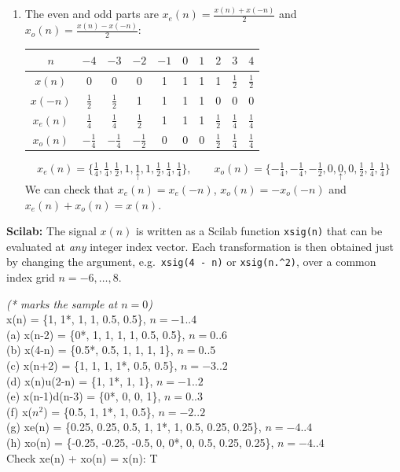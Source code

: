 \documentclass[12pt,a4paper]{article}
\newcommand{\org}[1]{\underset{\uparrow}{#1}}
\begin{document}
\begin{enumerate}[label=\textbf{(\alph*)}, leftmargin=*]
    \item[\textbf{(g)(h)}] The even and odd parts are $x_e(n) = \frac{x(n)+x(-n)}{2}$ and $x_o(n) = \frac{x(n)-x(-n)}{2}$:
    \begin{center}
    \begin{tabular}{|c|c|c|c|c|c|c|c|c|c|}
        \hline
        \rowcolor{headergray} $n$ & $-4$ & $-3$ & $-2$ & $-1$ & $0$ & $1$ & $2$ & $3$ & $4$ \\ \hline
        $x(n)$   & 0 & 0 & 0 & 1 & 1 & 1 & 1 & $\frac12$ & $\frac12$ \\ \hline
        $x(-n)$  & $\frac12$ & $\frac12$ & 1 & 1 & 1 & 1 & 0 & 0 & 0 \\ \hline
        $x_e(n)$ & $\frac14$ & $\frac14$ & $\frac12$ & 1 & 1 & 1 & $\frac12$ & $\frac14$ & $\frac14$ \\ \hline
        $x_o(n)$ & $-\frac14$ & $-\frac14$ & $-\frac12$ & 0 & 0 & 0 & $\frac12$ & $\frac14$ & $\frac14$ \\ \hline
    \end{tabular}
    \end{center}
    \[ x_e(n) = \{\tfrac14, \tfrac14, \tfrac12, 1, \org{1}, 1, \tfrac12, \tfrac14, \tfrac14\}, \qquad
       x_o(n) = \{-\tfrac14, -\tfrac14, -\tfrac12, 0, \org{0}, 0, \tfrac12, \tfrac14, \tfrac14\} \]
    We can check that $x_e(n) = x_e(-n)$, $x_o(n) = -x_o(-n)$ and $x_e(n) + x_o(n) = x(n)$.
\end{enumerate}

\noindent\textbf{Scilab:} The signal $x(n)$ is written as a Scilab function \texttt{xsig(n)} that can be evaluated at \emph{any} integer index vector. Each transformation is then obtained just by changing the argument, e.g.\ \texttt{xsig(4 - n)} or \texttt{xsig(n.\^{}2)}, over a common index grid $n = -6, \dots, 8$.


\begin{consoleoutput}
\textit{(* marks the sample at $n = 0$)}\\[4pt]
x(n) \hfill = \{1, 1*, 1, 1, 0.5, 0.5\}, \quad $n = -1..4$\\
(a) x(n-2) \hfill = \{0*, 1, 1, 1, 1, 0.5, 0.5\}, \quad $n = 0..6$\\
(b) x(4-n) \hfill = \{0.5*, 0.5, 1, 1, 1, 1\}, \quad $n = 0..5$\\
(c) x(n+2) \hfill = \{1, 1, 1, 1*, 0.5, 0.5\}, \quad $n = -3..2$\\
(d) x(n)u(2-n) \hfill = \{1, 1*, 1, 1\}, \quad $n = -1..2$\\
(e) x(n-1)d(n-3) \hfill = \{0*, 0, 0, 1\}, \quad $n = 0..3$\\
(f) x($n^2$) \hfill = \{0.5, 1, 1*, 1, 0.5\}, \quad $n = -2..2$\\
(g) xe(n) \hfill = \{0.25, 0.25, 0.5, 1, 1*, 1, 0.5, 0.25, 0.25\}, \quad $n = -4..4$\\
(h) xo(n) \hfill = \{-0.25, -0.25, -0.5, 0, 0*, 0, 0.5, 0.25, 0.25\}, \quad $n = -4..4$\\[2pt]
Check xe(n) + xo(n) = x(n): T
\end{consoleoutput}
\end{document}
